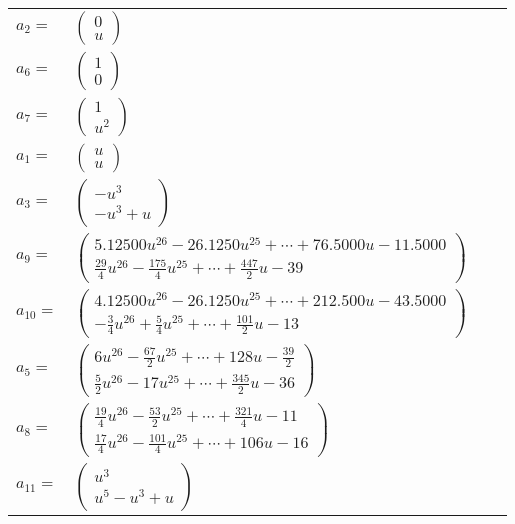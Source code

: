 \documentclass[1p]{elsarticle_modified}
\theoremstyle{definition}
\begin{document}
\begin{tabular}{m{7pt} m{180pt} m{7pt} m{180pt} }
\flushright $a_{2}=$&$\begin{pmatrix}0\\u\end{pmatrix}$ \\
\flushright $a_{6}=$&$\begin{pmatrix}1\\0\end{pmatrix}$ \\
\flushright $a_{7}=$&$\begin{pmatrix}1\\u^2\end{pmatrix}$ \\
\flushright $a_{1}=$&$\begin{pmatrix}u\\u\end{pmatrix}$ \\
\flushright $a_{3}=$&$\begin{pmatrix}- u^3\\- u^3+u\end{pmatrix}$ \\
\flushright $a_{9}=$&$\begin{pmatrix}5.12500 u^{26}-26.1250 u^{25}+\cdots+76.5000 u-11.5000\\\frac{29}{4} u^{26}-\frac{175}{4} u^{25}+\cdots+\frac{447}{2} u-39\end{pmatrix}$ \\
\flushright $a_{10}=$&$\begin{pmatrix}4.12500 u^{26}-26.1250 u^{25}+\cdots+212.500 u-43.5000\\-\frac{3}{4} u^{26}+\frac{5}{4} u^{25}+\cdots+\frac{101}{2} u-13\end{pmatrix}$ \\
\flushright $a_{5}=$&$\begin{pmatrix}6 u^{26}-\frac{67}{2} u^{25}+\cdots+128 u-\frac{39}{2}\\\frac{5}{2} u^{26}-17 u^{25}+\cdots+\frac{345}{2} u-36\end{pmatrix}$ \\
\flushright $a_{8}=$&$\begin{pmatrix}\frac{19}{4} u^{26}-\frac{53}{2} u^{25}+\cdots+\frac{321}{4} u-11\\\frac{17}{4} u^{26}-\frac{101}{4} u^{25}+\cdots+106 u-16\end{pmatrix}$ \\
\flushright $a_{11}=$&$\begin{pmatrix}u^3\\u^5- u^3+u\end{pmatrix}$ \\

\end{tabular}
\end{document}
